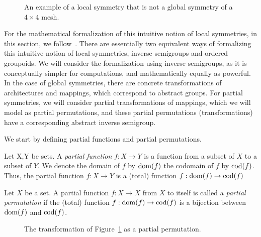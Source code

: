 \begin{figure}[h]
	\centering
   \resizebox{0.95\textwidth}{!}{
      \begin{tikzpicture}
      
      \end{tikzpicture}
      }
	\caption{An example of a local symmetry that is not a global symmetry of a $4 \times 4$ mesh.}
	\label{fig:partial_symmetries_4x4}
\end{figure}

For the mathematical formalization of this intuitive notion of local symmetries, in this section, we follow~\cite{lawson_inverse_semigroups}.
There are essentially two equivalent ways of formalizing this intuitive notion of local symmetries, inverse semigroups and ordered groupoids.
We will consider the formalization using inverse semigroups, as it is conceptually simpler for computations, and mathematically equally as powerful.
In the case of global symmetries, there are concrete transformations of architectures and mappings, which correspond to abstract groups.
For partial symmetries, we will consider partial transformations of mappings, which we will model as partial permutations, and these partial permutations (transformations) have a corresponding abstract inverse semigroup.

We start by defining partial functions and partial permutations.
\begin{defn}
Let X,Y be sets.
A \emph{partial function} $f: X \rightarrow Y$ is a function from a subset of $X$ to a subset of $Y$.
We denote the domain of $f$ by $\operatorname{dom}(f)$ the codomain of $f$ by $\operatorname{cod}(f)$.
Thus, the partial function $f: X \rightarrow Y$ is a (total) function $f: \operatorname{dom}(f) \rightarrow \operatorname{cod}(f)$
\end{defn}

\begin{defn}
Let $X$ be a set.
A partial function $f: X \rightarrow X$ from $X$ to itself is called a \emph{partial permutation} if the (total) function $f: \operatorname{dom}(f) \rightarrow \operatorname{cod}(f)$ is a bijection between $\operatorname{dom}(f)$ and $\operatorname{cod}(f)$.
\end{defn}

\begin{figure}[h]
	\centering
   \resizebox{0.95\textwidth}{!}{
      \begin{tikzpicture}
      
      \end{tikzpicture}
      }
	\caption{The transformation of Figure~\ref{fig:partial_symmetries_4x4} as a partial permutation.}
	\label{fig:example_partial_permutation}
\end{figure}

